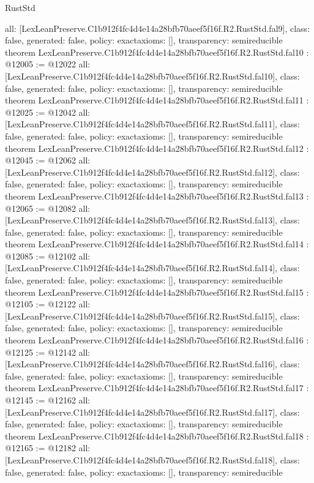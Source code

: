 \begin{lexlean}{RustStd}
\begin{coremodule}
{  all: [LexLeanPreserve.C1b912f4fc4d4e14a28bfb70aeef5f16f.R2.RustStd.fal9],
  class: false,
  generated: false,
  policy: exact{axioms: []},
  transparency: semireducible
}
theorem LexLeanPreserve.C1b912f4fc4d4e14a28bfb70aeef5f16f.R2.RustStd.fal10 : @12005 := @12022 {
  all: [LexLeanPreserve.C1b912f4fc4d4e14a28bfb70aeef5f16f.R2.RustStd.fal10],
  class: false,
  generated: false,
  policy: exact{axioms: []},
  transparency: semireducible
}
theorem LexLeanPreserve.C1b912f4fc4d4e14a28bfb70aeef5f16f.R2.RustStd.fal11 : @12025 := @12042 {
  all: [LexLeanPreserve.C1b912f4fc4d4e14a28bfb70aeef5f16f.R2.RustStd.fal11],
  class: false,
  generated: false,
  policy: exact{axioms: []},
  transparency: semireducible
}
theorem LexLeanPreserve.C1b912f4fc4d4e14a28bfb70aeef5f16f.R2.RustStd.fal12 : @12045 := @12062 {
  all: [LexLeanPreserve.C1b912f4fc4d4e14a28bfb70aeef5f16f.R2.RustStd.fal12],
  class: false,
  generated: false,
  policy: exact{axioms: []},
  transparency: semireducible
}
theorem LexLeanPreserve.C1b912f4fc4d4e14a28bfb70aeef5f16f.R2.RustStd.fal13 : @12065 := @12082 {
  all: [LexLeanPreserve.C1b912f4fc4d4e14a28bfb70aeef5f16f.R2.RustStd.fal13],
  class: false,
  generated: false,
  policy: exact{axioms: []},
  transparency: semireducible
}
theorem LexLeanPreserve.C1b912f4fc4d4e14a28bfb70aeef5f16f.R2.RustStd.fal14 : @12085 := @12102 {
  all: [LexLeanPreserve.C1b912f4fc4d4e14a28bfb70aeef5f16f.R2.RustStd.fal14],
  class: false,
  generated: false,
  policy: exact{axioms: []},
  transparency: semireducible
}
theorem LexLeanPreserve.C1b912f4fc4d4e14a28bfb70aeef5f16f.R2.RustStd.fal15 : @12105 := @12122 {
  all: [LexLeanPreserve.C1b912f4fc4d4e14a28bfb70aeef5f16f.R2.RustStd.fal15],
  class: false,
  generated: false,
  policy: exact{axioms: []},
  transparency: semireducible
}
theorem LexLeanPreserve.C1b912f4fc4d4e14a28bfb70aeef5f16f.R2.RustStd.fal16 : @12125 := @12142 {
  all: [LexLeanPreserve.C1b912f4fc4d4e14a28bfb70aeef5f16f.R2.RustStd.fal16],
  class: false,
  generated: false,
  policy: exact{axioms: []},
  transparency: semireducible
}
theorem LexLeanPreserve.C1b912f4fc4d4e14a28bfb70aeef5f16f.R2.RustStd.fal17 : @12145 := @12162 {
  all: [LexLeanPreserve.C1b912f4fc4d4e14a28bfb70aeef5f16f.R2.RustStd.fal17],
  class: false,
  generated: false,
  policy: exact{axioms: []},
  transparency: semireducible
}
theorem LexLeanPreserve.C1b912f4fc4d4e14a28bfb70aeef5f16f.R2.RustStd.fal18 : @12165 := @12182 {
  all: [LexLeanPreserve.C1b912f4fc4d4e14a28bfb70aeef5f16f.R2.RustStd.fal18],
  class: false,
  generated: false,
  policy: exact{axioms: []},
  transparency: semireducible
}
\end{coremodule}
\end{lexlean}
